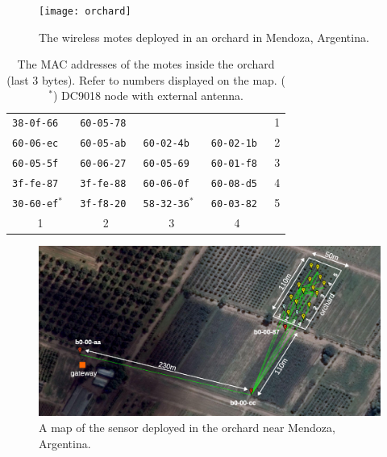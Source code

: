 \documentclass{sig-alternate}
\begin{document}
\begin{figure}
    \centering
    \texttt{[image: orchard]}
    \caption{The wireless motes deployed in an orchard in Mendoza, Argentina.}
    \label{fig:orchard}
\end{figure}

\begin{table}
\begin{center}
    \begin{tabular}{ | l | l | l | l | l |}
         \hline
         \tt{38-0f-66}     & \tt{60-05-78} &                   &               & 1 \\
         \tt{60-06-ec}     & \tt{60-05-ab} & \tt{60-02-4b}     & \tt{60-02-1b} & 2 \\
         \tt{60-05-5f}     & \tt{60-06-27} & \tt{60-05-69}     & \tt{60-01-f8} & 3 \\
         \tt{3f-fe-87}     & \tt{3f-fe-88} & \tt{60-06-0f}     & \tt{60-08-d5} & 4 \\
         \tt{30-60-ef}$^*$ & \tt{3f-f8-20} & \tt{58-32-36}$^*$ & \tt{60-03-82} & 5 \\
         \hline
           \multicolumn{1}{|c|}{1} & \multicolumn{1}{|c|}{2} & \multicolumn{1}{|c|}{3} & \multicolumn{1}{|c|}{4} &\\
         \hline
    \end{tabular}
    \caption{The MAC addresses of the motes inside the orchard (last 3 bytes). Refer to numbers displayed on the map. ($^*$) DC9018 node with external antenna.}
\end{center}
\end{table}

\begin{figure}
    \centering
    \includegraphics[width=\textwidth]{map_annotated}
    \caption{A map of the sensor deployed in the orchard near Mendoza, Argentina.}
    \label{fig:map}
\end{figure}
\end{document}
